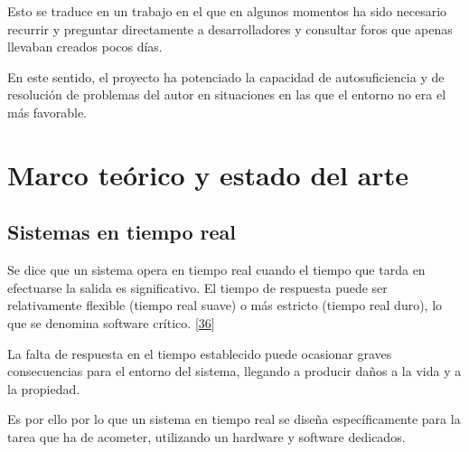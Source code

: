 \documentclass[a4paper,11pt,spanish]{sphinxmanual}
\begin{document}
\sphinxAtStartPar
Esto se traduce en un trabajo en el que en algunos momentos ha sido necesario
recurrir y preguntar directamente a desarrolladores y consultar foros que
apenas llevaban creados pocos días.

\sphinxAtStartPar
En este sentido, el proyecto ha potenciado la capacidad de autosuficiencia
y de resolución de problemas del autor en situaciones en las que el entorno
no era el más favorable.


\chapter{Marco teórico y estado del arte}
\label{\detokenize{marco_teorico_y_estado_del_arte:marco-teorico-y-estado-del-arte}}\label{\detokenize{marco_teorico_y_estado_del_arte::doc}}

\section{Sistemas en tiempo real}
\label{\detokenize{marco_teorico_y_estado_del_arte:sistemas-en-tiempo-real}}
\sphinxAtStartPar
Se dice que un sistema opera en tiempo real cuando el tiempo que tarda
en efectuarse la salida es significativo. El tiempo de respuesta puede
ser relativamente flexible (tiempo real suave) o más estricto (tiempo
real duro), lo que se denomina software crítico. {[}\hyperlink{cite.marco_teorico_y_estado_del_arte:id9}{36}{]}

\sphinxAtStartPar
La falta de respuesta en el tiempo establecido puede ocasionar graves
consecuencias para el entorno del sistema, llegando a producir daños a
la vida y a la propiedad.

\sphinxAtStartPar
Es por ello por lo que un sistema en tiempo real se diseña
específicamente para la tarea que ha de acometer, utilizando un hardware
y software dedicados.
\end{document}
